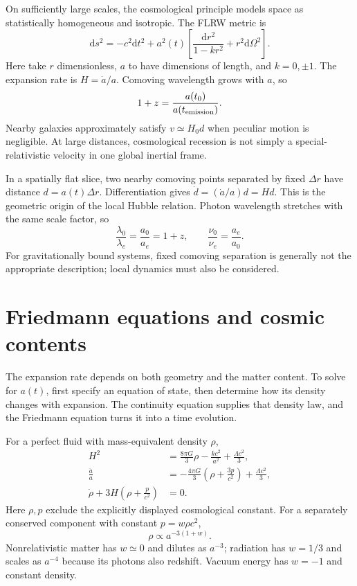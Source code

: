 \documentclass[11pt,oneside]{book}
\newcommand{\dd}{\mathrm{d}}
\theoremstyle{reviewstyle}
\begin{document}
On sufficiently large scales, the cosmological principle models space as statistically homogeneous and isotropic. The FLRW metric is
\begin{equation}\dd s^2=-c^2\dd t^2+a^2(t)\left[\frac{\dd r^2}{1-kr^2}+r^2\dd\Omega^2\right].\end{equation}
Here take $r$ dimensionless, $a$ to have dimensions of length, and $k=0,\pm1$. The expansion rate is $H=\dot a/a$. Comoving wavelength grows with $a$, so
\begin{equation}1+z=\frac{a(t_0)}{a(t_{\rm emission})}.\end{equation}
Nearby galaxies approximately satisfy $v\simeq H_0d$ when peculiar motion is negligible. At large distances, cosmological recession is not simply a special-relativistic velocity in one global inertial frame.

In a spatially flat slice, two nearby comoving points separated by fixed $\Delta r$ have distance $d=a(t)\Delta r$. Differentiation gives $\dot d=(\dot a/a)d=Hd$. This is the geometric origin of the local Hubble relation. Photon wavelength stretches with the same scale factor, so
\begin{equation}
\frac{\lambda_0}{\lambda_e}=\frac{a_0}{a_e}=1+z,
\qquad \frac{\nu_0}{\nu_e}=\frac{a_e}{a_0}.
\end{equation}
For gravitationally bound systems, fixed comoving separation is generally not the appropriate description; local dynamics must also be considered.

\section{Friedmann equations and cosmic contents}
The expansion rate depends on both geometry and the matter content. To solve for $a(t)$, first specify an equation of state, then determine how its density changes with expansion. The continuity equation supplies that density law, and the Friedmann equation turns it into a time evolution.

For a perfect fluid with mass-equivalent density $\rho$,
\begin{align}
H^2&=\frac{8\pi G}{3}\rho-\frac{kc^2}{a^2}+\frac{\Lambda c^2}{3},\\
\frac{\ddot a}{a}&=-\frac{4\pi G}{3}\left(\rho+\frac{3p}{c^2}\right)+\frac{\Lambda c^2}{3},\\
\dot\rho+3H\left(\rho+\frac p{c^2}\right)&=0.
\end{align}
Here $\rho,p$ exclude the explicitly displayed cosmological constant. For a separately conserved component with constant $p=w\rho c^2$,
\begin{equation}\rho\propto a^{-3(1+w)}.\end{equation}
Nonrelativistic matter has $w\simeq0$ and dilutes as $a^{-3}$; radiation has $w=1/3$ and scales as $a^{-4}$ because its photons also redshift. Vacuum energy has $w=-1$ and constant density.
\end{document}
